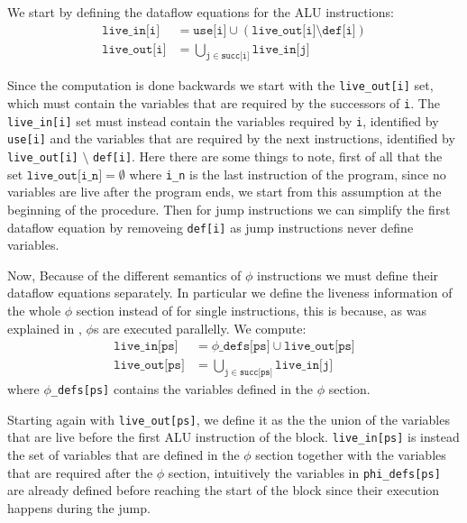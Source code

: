 We start by defining the dataflow equations for the ALU instructions:
\begin{align*}
  \texttt{live\_in[i]} &= \texttt{use[i]} \cup (\texttt{live\_out[i]} \setminus \texttt{def[i]}) \\
  \texttt{live\_out[i]} &= \bigcup \limits_{\texttt j \in \texttt{succ[i]}} \texttt{live\_in[j]}
\end{align*}

Since the computation is done backwards we start with the \texttt{live\_out[i]} set, which must contain the variables that are required by the successors of \texttt i. The
\texttt{live\_in[i]} set must instead contain the variables required by \texttt i, identified by \texttt{use[i]} and the variables that are required by the next instructions, identified by \texttt{live\_out[i]} $\setminus$ \texttt{def[i]}.
Here there are some things to note, first of all that the set $\texttt{live\_out[i\_n]} = \emptyset$ where \texttt{i\_n} is the last instruction of the program, since no variables are live after the program ends, we start from this assumption at the beginning of the procedure.
Then for jump instructions we can simplify the first dataflow equation by removeing \texttt{def[i]} as jump instructions never define variables.

Now, Because of the different semantics of $\phi$ instructions we must define their dataflow equations separately. In particular we define the liveness information of the whole $\phi$ section instead of for single instructions, this is because, as was explained in , $\phi$s are executed parallelly.
We compute:
\begin{align*}
  \texttt{live\_in[ps]} &= \texttt{$\phi$\_defs[ps]} \cup \texttt{live\_out[ps]} \\
  \texttt{live\_out[ps]} &= \bigcup \limits_{\texttt j \in \texttt{succ[ps]}} \texttt{live\_in[j]}
\end{align*}
where \texttt{$\phi$\_defs[ps]} contains the variables defined in the $\phi$ section.

Starting again with \texttt{live\_out[ps]}, we define it as the the union of the variables that are live before the first ALU instruction of the block. \texttt{live\_in[ps]} is instead the set of variables that are defined in the $\phi$ section together with the variables that are required after the $\phi$ section, intuitively the variables in \texttt{phi\_defs[ps]} are already defined before reaching the start of the block since their execution happens during the jump.


